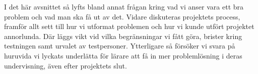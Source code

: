 \textcolor{Mahogany}{
    I det här avsnittet så lyfts bland annat frågan kring vad vi anser vara ett bra problem och vad man ska få ut av det. Vidare diskuteras projektets process, framför allt sett till hur vi utformat problemen och hur vi kunde utfört projektet annorlunda. Där läggs vikt vid vilka begränsningar vi fått göra, brister kring testningen samt urvalet av testpersoner.
    Ytterligare så försöker vi svara på huruvida vi lyckats underlätta för lärare att få in mer problemlösning i deras undervisning, även efter projektets slut.
}